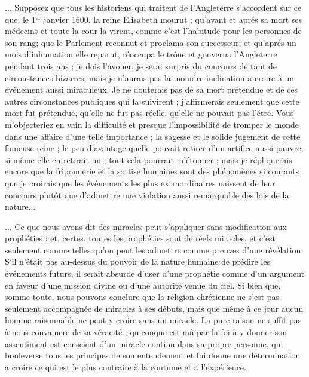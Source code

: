 ... Supposez que tous les historiens qui traitent de
l’Angleterre s’accordent sur ce que, le 1$^\text{er}$ janvier 1600,
la reine Elisabeth mourut ; qu’avant et aprés sa mort
ses médecins et toute la cour la virent, comme c’est l’habitude
pour les personnes de son rang; que le Parlement
reconnut et proclama son successeur; et qu’aprés un
mois d’inhumation elle reparut, réoccupa le trône et
gouverna l’Angleterre pendant trois ans ; je dois l’avouer,
je serai surpris du concours de tant de circonstances
bizarres, mais je n’aurais pas la moindre inclination a
croire à un événement aussi miraculeux. Je ne douterais
pas de sa mort prétendue et de ces autres circonstances
publiques qui la suivirent ; j’affirmerais seulement que
cette mort fut prétendue, qu’elle ne fut pas réelle, qu’elle
ne pouvait pas l’étre. Vous m’objecteriez en vain la difficulté
et presque l’impossibilité de tromper le monde
dans une affaire d’une telle importance ; la sagesse et le
solide jugement de cette fameuse reine ; le peu d’avantage
quelle pouvait retirer d’un artifice aussi pauvre, si même
elle en retirait un ; tout cela pourrait m’étonner ; mais je
répliquerais encore que la friponnerie et la sottise humaines
sont des phénomènes si courants que je croirais que les
événements les plus extraordinaires naissent de leur
concours plutôt que d’admettre une violation aussi remarquable
des lois de la nature...

... Ce que nous avons dit des miracles peut s’appliquer
sans modification aux prophéties ; et, certes, toutes les
prophéties sont de réels miracles, et c’est seulement
comme telles qu’on peut les admettre comme preuves
d'une révélation. S’il n’était pas au-dessus du pouvoir
de la nature humaine de prédire les événements futurs,
il serait absurde d’user d’une prophétie comme d’un argument
en faveur d’une mission divine ou d’une autorité
venue du ciel. Si bien que, somme toute, nous pouvons
conclure que la religion chrétienne ne s’est pas seulement
accompagnée de miracles à ses débuts, mais que même à
ce jour aucun homme raisonnable ne peut y croire sans un
miracle. La pure raison ne suffit pas à nous convaincre de
sa véracité ; quiconque est mû par la foi à y donner son
assentiment est conscient d’un miracle continu dans sa
propre personne, qui bouleverse tous les principes de son
entendement et lui donne une détermination a croire ce
qui est le plus contraire à la coutume et a l’expérience.

